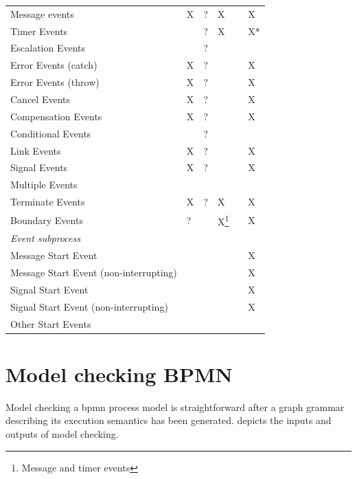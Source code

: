 \documentclass[adraft, copyright, creativecommons]{eptcs} %
\begin{document}
\begin{table}[htbp]
\begin{tabular}{l l l l l l}
      Message events & X & ? & X &  & X\\
      Timer Events &  & ? & X &  & X*\\
      Escalation Events & & ? & &  & \\
      Error Events (catch) & X & ? & &  & \color{yellow}X\\ %
      Error Events (throw) & X & ? & &  & \color{yellow}X\\
      Cancel Events & X & ? & &  & \color{yellow}X\\
      Compensation Events & X & ? & &  & \color{yellow}X\\
      Conditional Events &  & ? & &  & \\
      Link Events & X & ? & &  & X\\
      Signal Events & X & ? & &  & X\\
      Multiple Events &  & & &  & \\
      Terminate Events & X & ? & X & & X\\
     Boundary Events & ? & & X\footnote{Message and timer events} &  & X\\ %
      \textit{Event subprocess} &  &  &  &  & \\
      Message Start Event &  & & &  & X\\
      Message Start Event (non-interrupting) & & & &  & X\\
      Signal Start Event &  & & &  & X\\
      Signal Start Event (non-interrupting) &  & & &  & X\\
      Other Start Events &  & & &  & \\ %
    \end{tabular}

\end{table}


\section{Model checking BPMN}
Model checking a \gls*{bpmn} process model is straightforward after a graph grammar describing its execution semantics has been generated.
 depicts the inputs and outputs of model checking.
\end{document}
